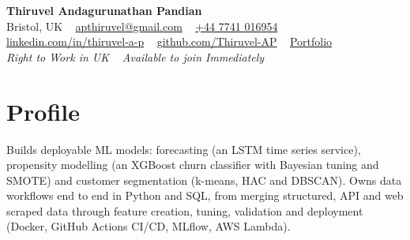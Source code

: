 \documentclass[a4paper,11pt]{article}
\begin{document}
\begin{center}
  {\fontsize{22}{26}\selectfont\bfseries\color{navy} Thiruvel Andagurunathan Pandian}\\[4pt]
  {\small
  Bristol, UK\nobreak\ \,\textperiodcentered\, \href{mailto:apthiruvel@gmail.com}{apthiruvel@gmail.com}\nobreak\ \,\textperiodcentered\, \href{tel:+447741016954}{+44 7741 016954}\nobreak\ \,\textperiodcentered\, \href{https://www.linkedin.com/in/thiruvel-a-p/}{linkedin.com/in/thiruvel-a-p}\nobreak\ \,\textperiodcentered\, \href{https://github.com/Thiruvel-AP}{github.com/Thiruvel-AP}\nobreak\ \,\textperiodcentered\, \href{https://thiruvel-ap.github.io/PersonalPortfolio/}{Portfolio}}\\[3pt]
  {\small\itshape\color{muted} Right to Work in UK\nobreak\ \,\textperiodcentered\, Available to join Immediately}

\end{center}

\section{Profile}
Builds deployable ML models: forecasting (an LSTM time series service), propensity modelling (an XGBoost churn classifier with Bayesian tuning and SMOTE) and customer segmentation (k-means, HAC and DBSCAN). Owns data workflows end to end in Python and SQL, from merging structured, API and web scraped data through feature creation, tuning, validation and deployment (Docker, GitHub Actions CI/CD, MLflow, AWS Lambda).
\end{document}
